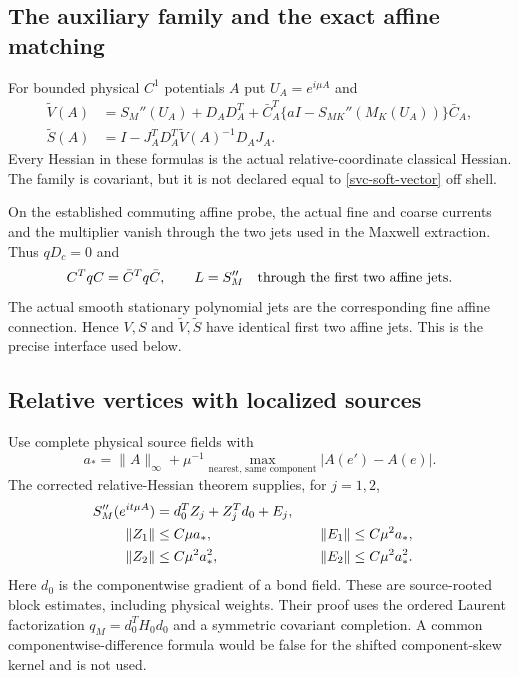 \subsection{The auxiliary family and the exact affine matching}
\label{svc-auxiliary-section}

For bounded physical $C^1$ potentials $A$ put $U_A=e^{i\mu A}$ and
\begin{align}
 \widetilde V(A)
  &=S_M''(U_A)+D_AD_A^T
       +\bar C_A^T\{aI-S_{MK}''(M_K(U_A))\}\bar C_A,
       \label{svc-auxiliary-vector}\\
 \widetilde S(A)
  &=I-J_A^TD_A^T\widetilde V(A)^{-1}D_AJ_A.
       \label{svc-auxiliary-coarse}
\end{align}
Every Hessian in these formulas is the actual relative-coordinate
classical Hessian. The family is covariant, but it is not declared equal
to \eqref{svc-soft-vector} off shell.

On the established commuting affine probe, the actual fine and coarse
currents and the multiplier vanish through the two jets used in the
Maxwell extraction. Thus $qD_c=0$ and
\begin{equation}
 C^TqC=\bar C^Tq\bar C,\qquad L=S_M''
 \quad\hbox{through the first two affine jets}.
 \label{svc-on-shell-match}
\end{equation}
The actual smooth stationary polynomial jets are the corresponding
fine affine connection. Hence $V,S$ and
$\widetilde V,\widetilde S$ have identical first two affine jets.
This is the precise interface used below.

\subsection{Relative vertices with localized sources}
\label{svc-vertices-section}

Use complete physical source fields with
\[
 a_* =\|A\|_\infty+
       \mu^{-1}\max_{\text{nearest, same component}}|A(e')-A(e)|.
\]
The corrected relative-Hessian theorem supplies, for $j=1,2$,
\begin{align}
 [t^j]S_M''(e^{it\mu A})
     &=d_0^TZ_j+Z_j^Td_0+E_j,\notag\\
 \|Z_1\|&\le C\mu a_*,&\quad \|E_1\|&\le C\mu^2a_*,\notag\\
 \|Z_2\|&\le C\mu^2a_*^2,&\quad \|E_2\|&\le C\mu^2a_*^2.
 \label{svc-relative-vertices}
\end{align}
Here $d_0$ is the componentwise gradient of a bond field. These are
source-rooted block estimates, including physical weights.
Their proof uses the ordered Laurent factorization
$q_M=d_0^TH_0d_0$ and a symmetric covariant completion. A common
componentwise-difference formula would be false for the shifted
component-skew kernel and is not used.

